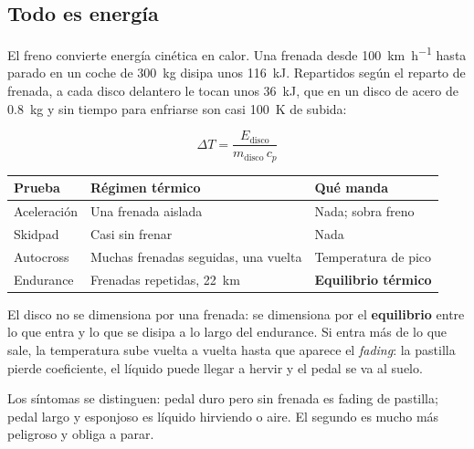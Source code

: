 \subsection{Todo es energía}

El freno convierte energía cinética en calor. Una frenada desde
\SI{100}{\kilo\meter\per\hour} hasta parado en un coche de
\SI{300}{\kilogram} disipa unos \SI{116}{\kilo\joule}. Repartidos según el
reparto de frenada, a cada disco delantero le tocan unos \SI{36}{\kilo\joule},
que en un disco de acero de \SI{0.8}{\kilogram} y sin tiempo para enfriarse son
casi \SI{100}{\kelvin} de subida:

\begin{equation}
  \Delta T = \frac{E_{\text{disco}}}{m_{\text{disco}}\,c_p}
  \label{eq:temperatura_disco}
\end{equation}

\begin{center}
\begin{tabularx}{\textwidth}{@{}lXl@{}}
\toprule
\textbf{Prueba} & \textbf{Régimen térmico} & \textbf{Qué manda} \\
\midrule
Aceleración & Una frenada aislada & Nada; sobra freno \\
Skidpad & Casi sin frenar & Nada \\
Autocross & Muchas frenadas seguidas, una vuelta & Temperatura de pico \\
Endurance & Frenadas repetidas, \SI{22}{\kilo\meter} & \textbf{Equilibrio térmico} \\
\bottomrule
\end{tabularx}
\end{center}

\begin{ojo}
El disco no se dimensiona por una frenada: se dimensiona por el
\textbf{equilibrio} entre lo que entra y lo que se disipa a lo largo del
endurance. Si entra más de lo que sale, la temperatura sube vuelta a vuelta
hasta que aparece el \emph{fading}: la pastilla pierde coeficiente, el líquido
puede llegar a hervir y el pedal se va al suelo.

Los síntomas se distinguen: pedal duro pero sin frenada es fading de pastilla;
pedal largo y esponjoso es líquido hirviendo o aire. El segundo es mucho más
peligroso y obliga a parar.
\end{ojo}

